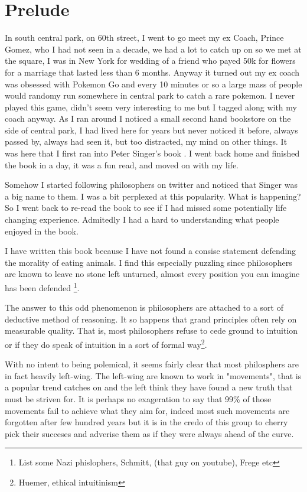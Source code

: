 \documentclass[12pt]{report}
\numberwithin{equation}{section}
\begin{document}
\tableofcontents 

\newpage

\chapter{Prelude}
In south central park, on 60th street, I went to go meet my ex Coach, Prince Gomez, who I had not seen in a decade, we had a lot to catch up on so we met at the square, I was in New York for wedding of a friend who payed 50k for flowers for a marriage that lasted less than 6 months. Anyway it turned out my ex coach was obsessed with Pokemon Go and every 10 minutes or so a large mass of people would randomy run somewhere in central park to catch a rare pokemon. I never played this game, didn't seem very interesting to me but I tagged along with my coach anyway. As I ran around I noticed a small second hand bookstore on the side of central park, I had lived here for years but never noticed it before, always passed by, always had seen it, but too distracted, my mind on other things. It was here that I first ran into Peter Singer's book \cite{singer1995animal}. I went back home and finished the book in a day, it was a fun read, and moved on with my life. 

Somehow I started following philosophers on twitter and noticed that Singer was a big name to them. I was a bit perplexed at this popularity. What is happening? So I went back to re-read the book to see if I had missed some potentially life changing experience. Admitedly I had a hard to understanding what people enjoyed in the book. 

I have written this book because I have not found a consise statement defending the morality of eating animals. I find this especially puzzling since philosophers are known to leave no stone left unturned, almost every position you can imagine has been defended \footnote{List some Nazi phislophers, Schmitt, (that guy on youtube), Frege etc}. 

The answer to this odd phenomenon is philosophers are attached to a sort of deductive method of reasoning. It so happens that grand principles often rely on measurable quality. That is, most philosophers refuse to cede ground to intuition or if they do speak of intuition in a sort of formal way\footnote{Huemer, ethical intuitinism}. 

With no intent to being polemical, it seems fairly clear that most philosphers are in fact heavily left-wing. The left-wing are known to work in "movements", that is a popular trend catches on and the left think they have found a new truth that must be striven for. It is perhaps no exageration to say that 99\% of those movements fail to achieve what they aim for, indeed most such movements are forgotten after few hundred years but it is in the credo of this group to cherry pick their succeses and adverise them as if they were always ahead of the curve. 
\end{document}
